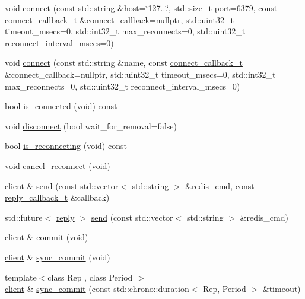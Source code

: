 \begin{DoxyCompactItemize}
void \hyperlink{classcpp__redis_1_1client_adda8b3e7b4f9c80ac052753b39178dd5}{connect} (const std\+::string \&host=\char`\"{}127...\char`\"{}, std\+::size\+\_\+t port=6379, const \hyperlink{classcpp__redis_1_1client_a4bb592b64ededde5a6fcf8111ca2548f}{connect\+\_\+callback\+\_\+t} \&connect\+\_\+callback=nullptr, std\+::uint32\+\_\+t timeout\+\_\+msecs=0, std\+::int32\+\_\+t max\+\_\+reconnects=0, std\+::uint32\+\_\+t reconnect\+\_\+interval\+\_\+msecs=0)
\item 
void \hyperlink{classcpp__redis_1_1client_a15bcb0885129480543482a7da52af892}{connect} (const std\+::string \&name, const \hyperlink{classcpp__redis_1_1client_a4bb592b64ededde5a6fcf8111ca2548f}{connect\+\_\+callback\+\_\+t} \&connect\+\_\+callback=nullptr, std\+::uint32\+\_\+t timeout\+\_\+msecs=0, std\+::int32\+\_\+t max\+\_\+reconnects=0, std\+::uint32\+\_\+t reconnect\+\_\+interval\+\_\+msecs=0)
\item 
bool \hyperlink{classcpp__redis_1_1client_ad3608dec2c2bfabf2c621ce14f4db37a}{is\+\_\+connected} (void) const
\item 
void \hyperlink{classcpp__redis_1_1client_a292252b61bcfdf9ad3854b54b7fe2740}{disconnect} (bool wait\+\_\+for\+\_\+removal=false)
\item 
bool \hyperlink{classcpp__redis_1_1client_af03ca1aec6416ab35e6aea93c74d89d1}{is\+\_\+reconnecting} (void) const
\item 
void \hyperlink{classcpp__redis_1_1client_adb605a877f65b8f54725576b45aeeca6}{cancel\+\_\+reconnect} (void)
\item 
\hyperlink{classcpp__redis_1_1client}{client} \& \hyperlink{classcpp__redis_1_1client_a490ef812b666e6d845fcacc808b87bc1}{send} (const std\+::vector$<$ std\+::string $>$ \&redis\+\_\+cmd, const \hyperlink{classcpp__redis_1_1client_a061a1140d36d2eaeda82b09a0bb3f9f2}{reply\+\_\+callback\+\_\+t} \&callback)
\item 
std\+::future$<$ \hyperlink{classcpp__redis_1_1reply}{reply} $>$ \hyperlink{classcpp__redis_1_1client_ad6216d6587d50694c16d68e8e182b0be}{send} (const std\+::vector$<$ std\+::string $>$ \&redis\+\_\+cmd)
\item 
\hyperlink{classcpp__redis_1_1client}{client} \& \hyperlink{classcpp__redis_1_1client_a36a48d61a4900e88fd67795ca59cbea3}{commit} (void)
\item 
\hyperlink{classcpp__redis_1_1client}{client} \& \hyperlink{classcpp__redis_1_1client_a23c8a27ee691c52713411ae91e1391fb}{sync\+\_\+commit} (void)
\item 
{\footnotesize template$<$class Rep , class Period $>$ }\\\hyperlink{classcpp__redis_1_1client}{client} \& \hyperlink{classcpp__redis_1_1client_a79a24c8367cb1229fd2c4c38d0f82533}{sync\+\_\+commit} (const std\+::chrono\+::duration$<$ Rep, Period $>$ \&timeout)

\end{DoxyCompactItemize}
